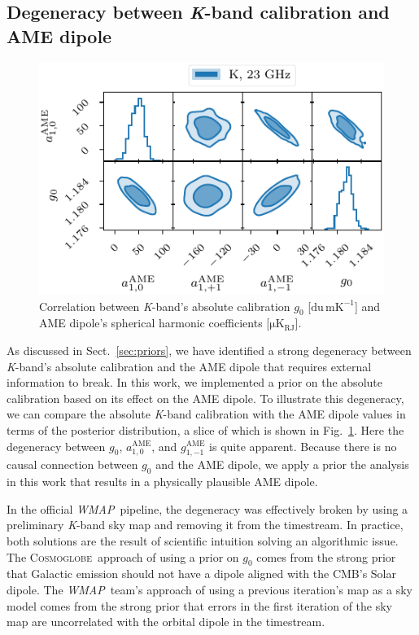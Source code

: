 \documentclass[twocolumn]{../../common/aa}
\def\WMAP{\emph{WMAP}}
\newcommand{\cosmoglobe}{\textsc{Cosmoglobe}}
\newcommand{\K}[0]{\textit K}
\begin{document}
\subsection{Degeneracy between \K-band calibration and AME dipole}
\label{sec:ame_Kband}

\begin{figure}
	\includegraphics[width=\columnwidth]{figures/ame_dipole_vs_g0_K.pdf}
	\caption{Correlation between \K-band's absolute calibration $g_0$ [$\mathrm{du\,mK^{-1}}$] and AME dipole's spherical harmonic coefficients [$\mathrm{\mu K_{RJ}}$].}
	\label{fig:ame_g0}
\end{figure}

As discussed in Sect.~\ref{sec:priors}, we have identified a strong degeneracy between \K-band's absolute calibration and the AME dipole that requires external information to break. In this work, we implemented a prior on the absolute calibration based on its effect on the AME dipole. To illustrate this degeneracy, we can compare the absolute \K-band calibration with the AME dipole values in terms of the posterior distribution, a slice of which is shown in Fig.~\ref{fig:ame_g0}. Here the degeneracy between $g_0$, $a_{1,0}^\mathrm{AME}$, and $g_{1,-1}^\mathrm{AME}$ is quite apparent. Because there is no causal connection between $g_0$ and the AME dipole, we apply a prior the analysis in this work that results in a physically plausible AME dipole.


In the official \WMAP\ pipeline, the degeneracy was effectively broken by using a preliminary \K-band sky map and removing it from the timestream.  In practice, both solutions are the result of scientific intuition solving an algorithmic issue. The \cosmoglobe\ approach of using a prior on $g_0$ comes from the strong prior that Galactic emission should not have a dipole aligned with the CMB's Solar dipole. The \WMAP\ team's approach of using a previous iteration's map as a sky model comes from the strong prior that errors in the first iteration of the sky map are uncorrelated with the orbital dipole in the timestream.
\end{document}
